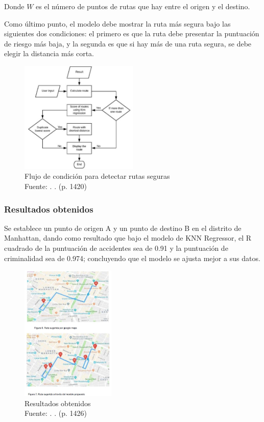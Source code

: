 Donde $W$ es el número de puntos de rutas que hay entre el origen y el destino.

Como último punto, el modelo debe mostrar la ruta más segura bajo las siguientes dos condiciones: el primero es que la ruta debe presentar la puntuación de riesgo más baja, y la segunda es que si hay más de una ruta segura, se debe elegir la distancia más corta.
\begin{figure}[h]
	\begin{center}
		\includegraphics[width=0.5\textwidth]{2/figures/CondicionSafe.jpg}
		\caption{Flujo de condición para detectar rutas seguras\\
			Fuente: \citep*{pr_Soni}. . (p. 1420)}
		\label{1:fig2}
	\end{center}
\end{figure}

\subsubsection{Resultados obtenidos}
Se establece un punto de origen A y un punto de destino B en el distrito de Manhattan, dando como resultado que bajo el modelo de KNN Regressor, el R cuadrado de la puntuación de accidentes sea de 0.91 y la puntuación de criminalidad sea de 0.974; concluyendo que el modelo se ajusta mejor a sus datos.

\begin{figure}[h]
	\begin{center}
		\includegraphics[width=0.4\textwidth]{2/figures/resultRoute.jpg}
		\caption{Resultados obtenidos\\
			Fuente: \citep*{pr_Soni}. . (p. 1426)}
		\label{1:fig2}
	\end{center}
\end{figure}

